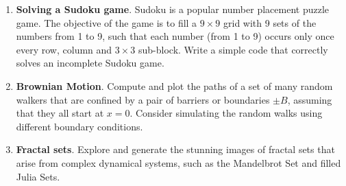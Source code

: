 \documentclass[a4paper,margins=1in]{article}
\begin{document}
\begin{enumerate}
    \item \textbf{Solving a Sudoku game}. Sudoku is a popular number placement puzzle game. The objective of the game is to fill a $9\times9$ grid with 9 sets of the numbers from 1 to 9, such that each number (from 1 to 9) occurs only once every row, column and $3\times3$ sub-block. Write a simple code that correctly solves an incomplete Sudoku game.
    \item \textbf{Brownian Motion}. Compute and plot the paths of a set of many random walkers that are confined by a pair of barriers or boundaries $\pm B$, assuming that they all start at $x=0$. Consider simulating the random walks using different boundary conditions.
    \item \textbf{Fractal sets}. Explore and generate the stunning images of fractal sets that arise from complex dynamical systems, such as the Mandelbrot Set and filled Julia Sets.
\end{enumerate}
\end{document}
